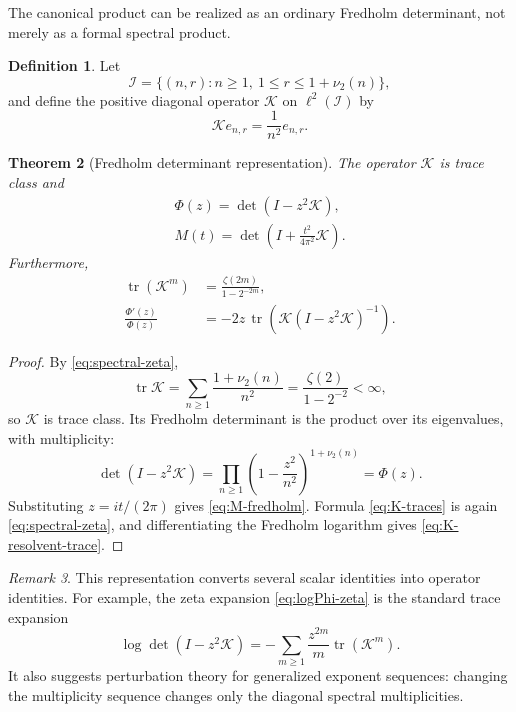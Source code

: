 \documentclass[11pt]{article}
\newtheorem{theorem}{Theorem}[section]
\theoremstyle{definition}
\newtheorem{definition}[theorem]{Definition}
\theoremstyle{remark}
\newtheorem{remark}[theorem]{Remark}
\newcommand{\tr}{\operatorname{tr}}
\newcommand{\cK}{\mathcal K}
\begin{document}
The canonical product can be realized as an ordinary Fredholm determinant, not merely as a
formal spectral product.

\begin{definition}
Let
\begin{equation}
 \mathcal I=\{(n,r):n\ge1,\ 1\le r\le 1+\nu_2(n)\},
\end{equation}
and define the positive diagonal operator \(\cK\) on \(\ell^2(\mathcal I)\) by
\begin{equation}
 \cK e_{n,r}=\frac1{n^2}e_{n,r}.                             \label{eq:K-def}
\end{equation}
\end{definition}

\begin{theorem}[Fredholm determinant representation]\label{thm:fredholm}
The operator \(\cK\) is trace class and
\begin{align}
 \boxed{\Phi(z)=\det(I-z^2\cK)},                             \label{eq:Phi-fredholm}\\
 \boxed{M(t)=\det\!\left(I+\frac{t^2}{4\pi^2}\cK\right)}.  \label{eq:M-fredholm}
\end{align}
Furthermore,
\begin{align}
 \tr(\cK^m)&=\frac{\zeta(2m)}{1-2^{-2m}},                   \label{eq:K-traces}\\
 \frac{\Phi'(z)}{\Phi(z)}
 &=-2z\,\tr\!\left(\cK(I-z^2\cK)^{-1}\right).            \label{eq:K-resolvent-trace}
\end{align}
\end{theorem}

\begin{proof}
By \eqref{eq:spectral-zeta},
\[
 \tr\cK=\sum_{n\ge1}\frac{1+\nu_2(n)}{n^2}
 =\frac{\zeta(2)}{1-2^{-2}}<\infty,
\]
so \(\cK\) is trace class.  Its Fredholm determinant is the product over its eigenvalues,
with multiplicity:
\[
 \det(I-z^2\cK)
 =\prod_{n\ge1}\left(1-\frac{z^2}{n^2}\right)^{1+\nu_2(n)}
 =\Phi(z).
\]
Substituting \(z=it/(2\pi)\) gives \eqref{eq:M-fredholm}.  Formula
\eqref{eq:K-traces} is again \eqref{eq:spectral-zeta}, and differentiating the Fredholm
logarithm gives \eqref{eq:K-resolvent-trace}.
\end{proof}

\begin{remark}
This representation converts several scalar identities into operator identities.  For
example, the zeta expansion \eqref{eq:logPhi-zeta} is the standard trace expansion
\[
 \log\det(I-z^2\cK)=-\sum_{m\ge1}\frac{z^{2m}}m\tr(\cK^m).
\]
It also suggests perturbation theory for generalized exponent sequences: changing the
multiplicity sequence changes only the diagonal spectral multiplicities.
\end{remark}
\end{document}

